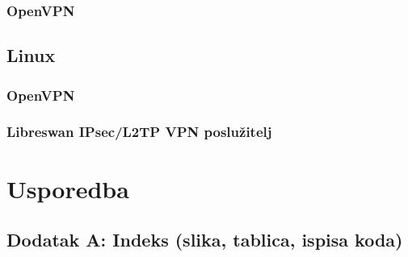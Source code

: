 \documentclass[a4paper, 14pt]{article}
\begin{document}
	\subsubsection{OpenVPN}
	

	\newpage
	\subsection{Linux}
	
	\subsubsection{OpenVPN}
	
	\newpage
	\subsubsection{Libreswan IPsec/L2TP VPN poslužitelj}
	

        \newpage
        \section{Usporedba} 
        
	



	\newpage
	
	
	\nocite{*}
	
	\newpage
	\begin{appendices}
		\section{Dodatak A: Indeks (slika, tablica, ispisa koda)}
			\renewcommand\listfigurename{}
			\listoffigures
		


	\end{appendices}
	
\end{document}
